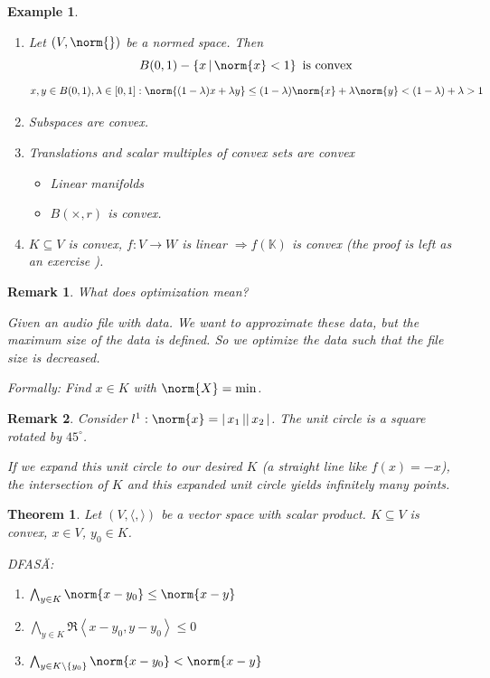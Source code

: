 \documentclass[a4paper,landscape,twocolumn]{article}
\newcommand\abs[1]{|\,#1\,|}
\newcommand\set[1]{\left\{#1\right\}}
\newcommand\setdef[2]{\left\{#1\,\middle|\,#2\right\}}
\newcommand\functional[1]{\left\langle{#1}\right\rangle}
\newtheorem{theorem}{Theorem}
\newtheorem{ex}{Example}
\newtheorem{rem}{Remark}
\DeclarePairedDelimiter\norm\lVert\rVert
\begin{document}
\begin{ex}
  \label{bsp-8.45}
  \begin{enumerate}
    \item Let $(V, \norm{ })$ be a normed space. Then
      \[ B(0,1) - \setdef{x}{\norm{x} < 1} \text{ is convex} \]
      \[ x,y \in B(0,1), \lambda \in [0,1]: \norm{(1 - \lambda) x + \lambda y} \leq (1 - \lambda) \norm{x} + \lambda \norm{y} < (1 - \lambda) + \lambda > 1 \]
    \item Subspaces are convex.
    \item Translations and scalar multiples of convex sets are convex
      \begin{itemize}
        \item Linear manifolds
        \item $B(\times, r)$ is convex.
      \end{itemize}
    \item $K \subseteq V$ is convex, $f: V \to W$ is linear $\Rightarrow f(\mathbb K)$ is convex (the proof is left as an exercise  ).
  \end{enumerate}
\end{ex}

\begin{rem}
  What does optimization mean?

  Given an audio file with data. We want to approximate these data, but the maximum size of the data is defined.
  So we optimize the data such that the file size is decreased.

  Formally: Find $x \in K$ with $\norm{X} = \min$.
\end{rem}

\begin{rem}
  Consider $l^1: \norm{x} = \abs{x_1} \abs{x_2}$.
  The unit circle is a square rotated by $45^\circ$.

  If we expand this unit circle to our desired $K$ (a straight line like $f(x) = -x$),
  the intersection of $K$ and this expanded unit circle yields infinitely many points.
\end{rem}

\begin{theorem}
  \label{satz-8.46}
  Let $(V, \langle, \rangle)$ be a vector space with scalar product.
  $K \subseteq V$ is convex, $x \in V$, $y_0 \in K$.

  DFASÄ:
  \begin{enumerate}
    \item $\bigwedge_{y \in K} \norm{x - y_0} \leq \norm{x - y}$
    \item $\bigwedge_{y \in K} \Re\functional{x - y_0, y - y_0} \leq 0$
    \item $\bigwedge_{y \in K \setminus \set{y_0}} \norm{x - y_0} < \norm{x - y}$
  \end{enumerate}
\end{theorem}
\end{document}
